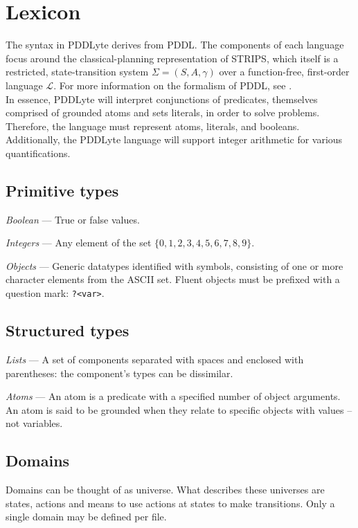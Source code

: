 \documentclass[
a4paper, %
11pt, %
onecolumn, %
openany, %
]{memoir}
\begin{document}
\section{Lexicon}
{\setlength{\parindent}{0cm}

The syntax in PDDLyte derives from PDDL. The components of each language focus around the classical-planning representation of STRIPS, which itself is a restricted, state-transition system $\Sigma = (S,A,\gamma)$ over a function-free, first-order language $\mathcal{L}$. For more information on the formalism of PDDL, see \cite{auto_planning}.\\
 
In essence, PDDLyte will interpret conjunctions of predicates, themselves comprised of grounded atoms and sets literals, in order to solve problems. Therefore, the language must represent atoms, literals, and booleans. Additionally, the PDDLyte language will support integer arithmetic for various quantifications. 

\subsection{Primitive types}

\textit{Boolean} --- True or false values.

\textit{Integers} --- Any element of the set $\{0, 1, 2, 3, 4, 5, 6, 7, 8, 9 \}$. 

\textit{Objects} --- Generic datatypes identified with symbols, consisting of one or more character elements from the ASCII set. Fluent objects must be prefixed with a question mark: \texttt{?<var>}.

\subsection{Structured types}

\textit{Lists} --- A set of components separated with spaces and enclosed with parentheses: the component's types can be dissimilar.

\textit{Atoms} --- An atom is a predicate with a specified number of object arguments. An atom is said to be grounded when they relate to specific objects with values -- not variables.

\subsection{Domains} 
Domains can be thought of as universe. What describes these universes are states, actions and means to use actions at states to make transitions. Only a single domain may be defined per file. 

}
\end{document}

